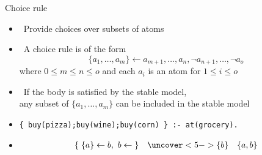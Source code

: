 \begin{frame}[fragile]{Choice rule}
  \label{eqn:choice:rule}
  \begin{itemize}
  \item {} \ Provide choices over subsets of atoms
  \item {} \ A \alert{choice rule} is of the form
    \[
    \{a_1,\dots,a_m\}\leftarrow a_{m+1},\dots,a_n,\neg a_{n+1},\dots,\neg a_o
    \]
    where $0\leq m\leq n\leq o$ and each $a_i$ is an atom for $1\leq i\leq o$
    \smallskip
  \item<2->  \ If the body is satisfied by the stable model,\\
    any subset of $\{a_1,\dots,a_m\}$ can be included in the stable model
    \medskip
  \item<3->   %
\begin{lstlisting}[basicstyle=\ttfamily\small]
{ buy(pizza);buy(wine);buy(corn) } :- at(grocery).
\end{lstlisting}
  \item<4-> 
    \begin{align*}
      & \{\;\{a\}\leftarrow b,\ b\leftarrow\;\}&\uncover<5->{\{b\}\quad\{a,b\}}
    \end{align*}
  \end{itemize}
\end{frame}
